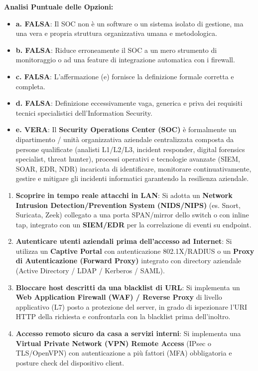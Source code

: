 \documentclass[11pt,a4paper]{article}
\begin{document}
\begin{solutionbox}
\textbf{Analisi Puntuale delle Opzioni:}
\begin{itemize}
    \item \textbf{a. FALSA}: Il SOC non \`e un software o un sistema isolato di gestione, ma una vera e propria struttura organizzativa umana e metodologica.
    \item \textbf{b. FALSA}: Riduce erroneamente il SOC a un mero strumento di monitoraggio o ad una feature di integrazione automatica con i firewall.
    \item \textbf{c. FALSA}: L'affermazione (e) fornisce la definizione formale corretta e completa.
    \item \textbf{d. FALSA}: Definizione eccessivamente vaga, generica e priva dei requisiti tecnici specialistici dell'Information Security.
    \item \textbf{e. VERA}: Il \textbf{Security Operations Center (SOC)} \`e formalmente un dipartimento / unit\`a organizzativa aziendale centralizzata composta da persone qualificate (analisti L1/L2/L3, incident responder, digital forensics specialist, threat hunter), processi operativi e tecnologie avanzate (SIEM, SOAR, EDR, NDR) incaricata di identificare, monitorare continuativamente, gestire e mitigare gli incidenti informatici garantendo la resilienza aziendale.
\end{itemize}
\end{solutionbox}

\begin{solutionbox}
\begin{enumerate}
    \item \textbf{Scoprire in tempo reale attacchi in LAN}: Si adotta un \textbf{Network Intrusion Detection/Prevention System (NIDS/NIPS)} (es. Snort, Suricata, Zeek) collegato a una porta SPAN/mirror dello switch o con inline tap, integrato con un \textbf{SIEM/EDR} per la correlazione di eventi su endpoint.
    \item \textbf{Autenticare utenti aziendali prima dell'accesso ad Internet}: Si utilizza un \textbf{Captive Portal} con autenticazione 802.1X/RADIUS o un \textbf{Proxy di Autenticazione (Forward Proxy)} integrato con directory aziendale (Active Directory / LDAP / Kerberos / SAML).
    \item \textbf{Bloccare host descritti da una blacklist di URL}: Si implementa un \textbf{Web Application Firewall (WAF) / Reverse Proxy} di livello applicativo (L7) posto a protezione del server, in grado di ispezionare l'URI HTTP della richiesta e confrontarla con la blacklist prima dell'inoltro.
    \item \textbf{Accesso remoto sicuro da casa a servizi interni}: Si implementa una \textbf{Virtual Private Network (VPN) Remote Access} (IPsec o TLS/OpenVPN) con autenticazione a pi\`u fattori (MFA) obbligatoria e posture check del dispositivo client.
\end{enumerate}
\end{solutionbox}
\end{document}
